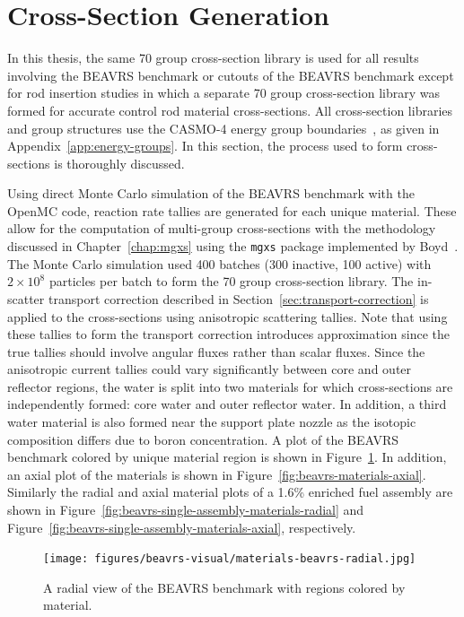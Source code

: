 \section{Cross-Section Generation}
\label{sec:beavrs-xs-gen}

In this thesis, the same 70 group cross-section library is used for all results involving the BEAVRS benchmark or cutouts of the BEAVRS benchmark except for rod insertion studies in which a separate 70 group cross-section library was formed for accurate control rod material cross-sections. All cross-section libraries and group structures use the CASMO-4 energy group boundaries~\cite{edenius1995casmo}, as given in Appendix~\ref{app:energy-groups}. In this section, the process used to form cross-sections is thoroughly discussed.

Using direct Monte Carlo simulation of the BEAVRS benchmark with the OpenMC code, reaction rate tallies are generated for each unique material. These allow for the computation of multi-group cross-sections with the methodology discussed in Chapter~\ref{chap:mgxs} using the \texttt{mgxs} package implemented by Boyd~\cite{boyd2017thesis}. The Monte Carlo simulation used 400 batches (300 inactive, 100 active) with $2 \times 10^8$ particles per batch to form the 70 group cross-section library. The in-scatter transport correction described in Section~\ref{sec:transport-correction} is applied to the cross-sections using anisotropic scattering tallies. Note that using these tallies to form the transport correction introduces approximation since the true tallies should involve angular fluxes rather than scalar fluxes. Since the anisotropic current tallies could vary significantly between core and outer reflector regions, the water is split into two materials for which cross-sections are independently formed: core water and outer reflector water. In addition, a third water material is also formed near the support plate nozzle as the isotopic composition differs due to boron concentration. A plot of the BEAVRS benchmark colored by unique material region is shown in Figure~\ref{fig:beavrs-materials-radial}. In addition, an axial plot of the materials is shown in Figure~\ref{fig:beavrs-materials-axial}. Similarly the radial and axial material plots of a 1.6\% enriched fuel assembly are shown in Figure~\ref{fig:beavrs-single-assembly-materials-radial} and Figure~\ref{fig:beavrs-single-assembly-materials-axial}, respectively.


\begin{figure}[h!]
	\centering
	\texttt{[image: figures/beavrs-visual/materials-beavrs-radial.jpg]}
	\caption{A radial view of the BEAVRS benchmark with regions colored by material.}
	\label{fig:beavrs-materials-radial}
\end{figure} 

